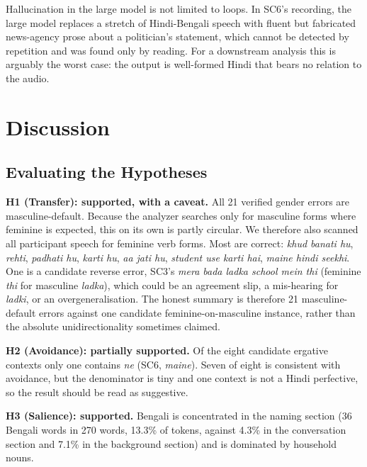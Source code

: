 \documentclass[11pt,a4paper]{report}
\begin{document}
Hallucination in the large model is not limited to loops. In SC6's recording, the large model replaces a stretch of Hindi-Bengali speech with fluent but fabricated news-agency prose about a politician's statement, which cannot be detected by repetition and was found only by reading. For a downstream analysis this is arguably the worst case: the output is well-formed Hindi that bears no relation to the audio.

\chapter{Discussion}
\label{sec:discussion}

\section{Evaluating the Hypotheses}

\textbf{H1 (Transfer): supported, with a caveat.} All 21 verified gender errors are masculine-default. Because the analyzer searches only for masculine forms where feminine is expected, this on its own is partly circular. We therefore also scanned all participant speech for feminine verb forms. Most are correct: \textit{khud banati hu}, \textit{rehti}, \textit{padhati hu}, \textit{karti hu}, \textit{aa jati hu}, \textit{student use karti hai}, \textit{maine hindi seekhi}. One is a candidate reverse error, SC3's \textit{mera bada ladka school mein thi} (feminine \textit{thi} for masculine \textit{ladka}), which could be an agreement slip, a mis-hearing for \textit{ladki}, or an overgeneralisation. The honest summary is therefore 21 masculine-default errors against one candidate feminine-on-masculine instance, rather than the absolute unidirectionality sometimes claimed.

\textbf{H2 (Avoidance): partially supported.} Of the eight candidate ergative contexts only one contains \textit{ne} (SC6, \textit{maine}). Seven of eight is consistent with avoidance, but the denominator is tiny and one context is not a Hindi perfective, so the result should be read as suggestive.

\textbf{H3 (Salience): supported.} Bengali is concentrated in the naming section (36 Bengali words in 270 words, 13.3\% of tokens, against 4.3\% in the conversation section and 7.1\% in the background section) and is dominated by household nouns.
\end{document}
